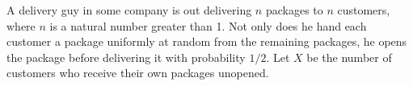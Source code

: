 \documentclass[11pt]{article}
\begin{document}
\begin{solution}

    
\end{solution}
\pagebreak
{}

A delivery guy in some company is out delivering $n$ packages to $n$ customers, where $n$ is a natural number greater than 1.
Not only does he hand each customer a package uniformly at random from the remaining packages, he opens the package before delivering it with probability $1/2$.
Let $X$ be the number of customers who receive their own packages unopened. 
\end{document}

